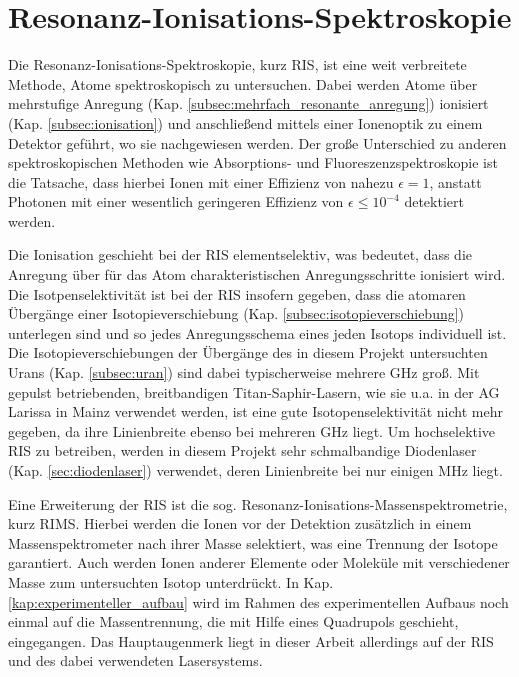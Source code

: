 \section{Resonanz-Ionisations-Spektroskopie}\label{sec:ris}
Die Resonanz-Ionisations-Spektroskopie, kurz RIS, ist eine weit verbreitete
Methode, Atome spektroskopisch zu untersuchen. Dabei werden Atome über
mehrstufige Anregung (Kap. \ref{subsec:mehrfach_resonante_anregung})
ionisiert (Kap. \ref{subsec:ionisation}) und anschließend mittels
einer Ionenoptik zu einem Detektor geführt, wo sie nachgewiesen werden. Der große Unterschied zu anderen spektroskopischen Methoden wie Absorptions- und Fluoreszenzspektroskopie ist die
Tatsache, dass hierbei Ionen mit einer Effizienz von nahezu $\epsilon=1$,
anstatt Photonen mit einer wesentlich geringeren Effizienz von
$\epsilon\leq10^{-4}$ detektiert werden.\par
Die Ionisation geschieht bei der RIS elementselektiv, was bedeutet, dass die
Anregung über für das Atom charakteristischen Anregungsschritte ionisiert wird.
Die Isotpenselektivität ist bei der RIS insofern gegeben, dass die atomaren
Übergänge einer Isotopieverschiebung (Kap. \ref{subsec:isotopieverschiebung})
unterlegen sind und so jedes Anregungsschema eines jeden Isotops individuell
ist. Die Isotopieverschiebungen der Übergänge des in diesem Projekt
untersuchten Urans (Kap. \ref{subsec:uran}) sind dabei typischerweise mehrere
GHz groß. Mit gepulst betriebenden, breitbandigen
Titan-Saphir-Lasern, wie sie u.a. in der AG Larissa in Mainz verwendet werden,
ist eine gute Isotopenselektivität nicht mehr gegeben, da ihre Linienbreite
ebenso bei mehreren GHz liegt. Um hochselektive RIS zu betreiben,
werden in diesem Projekt sehr schmalbandige Diodenlaser
(Kap. \ref{sec:diodenlaser}) verwendet, deren Linienbreite bei nur einigen
MHz liegt.\par
Eine Erweiterung der RIS ist die sog. Resonanz-Ionisations-Massenspektrometrie,
kurz RIMS. Hierbei werden die Ionen vor der Detektion zusätzlich in einem
Massenspektrometer nach ihrer Masse selektiert, was eine Trennung der Isotope
garantiert. Auch werden Ionen anderer Elemente oder Moleküle mit verschiedener
Masse zum untersuchten Isotop unterdrückt. In Kap.
\ref{kap:experimenteller_aufbau} wird im Rahmen des experimentellen Aufbaus noch
einmal auf die Massentrennung, die mit Hilfe eines Quadrupols geschieht,
eingegangen. Das Hauptaugenmerk liegt in dieser Arbeit allerdings auf der RIS
und des dabei verwendeten Lasersystems.

